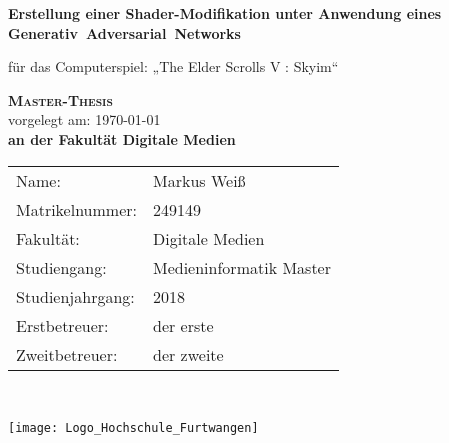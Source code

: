 \documentclass[a4paper,12pt]{scrreprt}
\begin{document}


\begin{titlepage}
    \begin{center}
    \huge \textbf{\textsf{Erstellung einer Shader-Modifikation unter Anwendung eines Generativ~Adversarial~Networks}} \\
    \vspace{2cm}
    	{\Large für das Computerspiel: „The Elder Scrolls V  \textsuperscript{\textcopyright}: Skyim“ \par}
    \vspace{2cm}	
    \LARGE\textbf{\textsc{Master-Thesis}}\\
    \vspace{1cm}
    \normalsize
    vorgelegt am: \today \\
    \vspace{2.5cm}
    \large \textbf{an der Fakultät Digitale Medien}\\
    \vspace{3cm}
    \end{center}
 \normalsize{
    \begin{tabular}{ll}
    	Name: & {Markus Weiß} \\
    	Matrikelnummer: & {249149} \\
		Fakultät: & Digitale Medien \\
    	Studiengang: & Medieninformatik Master\\
    	Studienjahrgang: & 2018\\
      Erstbetreuer: & {der erste} \\
      Zweitbetreuer: & {der zweite} \\
    \end{tabular}\\
    }
    \texttt{[image: Logo\_Hochschule\_Furtwangen]}
\end{titlepage}


\tableofcontents












\end{document}
